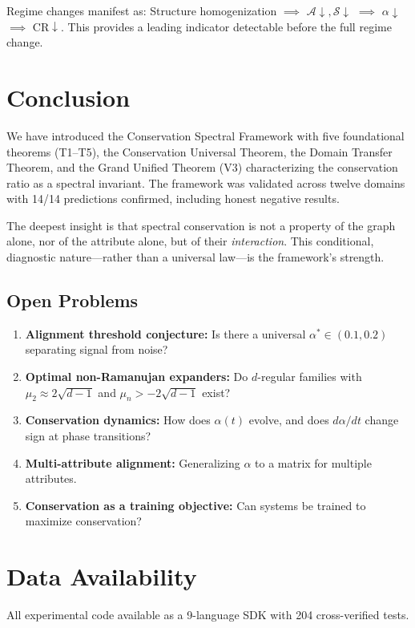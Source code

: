\documentclass[12pt,letterpaper]{article}
\newcommand{\CR}{\mathrm{CR}}
\newcommand{\cA}{\mathcal{A}}
\newcommand{\cS}{\mathcal{S}}
\begin{document}
Regime changes manifest as: Structure homogenization $\implies$ $\cA \downarrow, \cS \downarrow$ $\implies$ $\alpha \downarrow$ $\implies$ $\CR \downarrow$. This provides a leading indicator detectable before the full regime change.

\section{Conclusion}
\label{sec:conclusion}

We have introduced the Conservation Spectral Framework with five foundational theorems (T1--T5), the Conservation Universal Theorem, the Domain Transfer Theorem, and the Grand Unified Theorem (V3) characterizing the conservation ratio as a spectral invariant. The framework was validated across twelve domains with 14/14 predictions confirmed, including honest negative results.

The deepest insight is that spectral conservation is not a property of the graph alone, nor of the attribute alone, but of their \emph{interaction}. This conditional, diagnostic nature---rather than a universal law---is the framework's strength.

\subsection*{Open Problems}

\begin{enumerate}
  \item \textbf{Alignment threshold conjecture:} Is there a universal $\alpha^* \in (0.1, 0.2)$ separating signal from noise?
  \item \textbf{Optimal non-Ramanujan expanders:} Do $d$-regular families with $\mu_2 \approx 2\sqrt{d-1}$ and $\mu_n > -2\sqrt{d-1}$ exist?
  \item \textbf{Conservation dynamics:} How does $\alpha(t)$ evolve, and does $d\alpha/dt$ change sign at phase transitions?
  \item \textbf{Multi-attribute alignment:} Generalizing $\alpha$ to a matrix for multiple attributes.
  \item \textbf{Conservation as a training objective:} Can systems be trained to maximize conservation?
\end{enumerate}

\section*{Data Availability}
All experimental code available as a 9-language SDK with 204 cross-verified tests.
\end{document}
